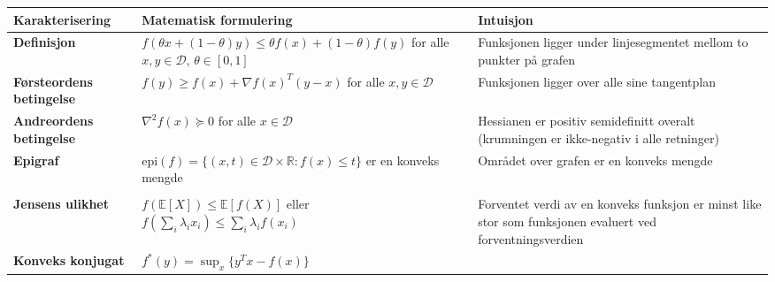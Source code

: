 \begin{table}[H]
	\centering
	\begin{tabular}{|p{3cm}|p{6cm}|p{5cm}|}
		\hline
		\rowcolor{blue!15}
		\textbf{Karakterisering}                                     & \textbf{Matematisk formulering} & \textbf{Intuisjon} \\
		\hline
		\textbf{Definisjon}                                          &
		$f(\theta x + (1-\theta)y) \leq \theta f(x) + (1-\theta)f(y)$ \newline
		for alle $x,y \in \mathcal{D}$, $\theta \in [0,1]$           &
		Funksjonen ligger under linjesegmentet mellom to punkter på grafen                                                  \\
		\hline
		\textbf{Førsteordens betingelse}                             &
		$f(y) \geq f(x) + \nabla f(x)^T(y-x)$ \newline
		for alle $x,y \in \mathcal{D}$                               &
		Funksjonen ligger over alle sine tangentplan                                                                        \\
		\hline
		\textbf{Andreordens betingelse}                              &
		$\nabla^2 f(x) \succeq 0$ for alle $x \in \mathcal{D}$       &
		Hessianen er positiv semidefinitt overalt (krumningen er ikke-negativ i alle retninger)                             \\
		\hline
		\textbf{Epigraf}                                             &
		$\text{epi}(f) = \{(x,t) \in \mathcal{D} \times \mathbb{R} : f(x) \leq t\}$ \newline
		er en konveks mengde                                         &
		Området over grafen er en konveks mengde                                                                            \\
		\hline
		\rowcolor{blue!5}
		\multicolumn{3}{|l|}{\textbf{Avanserte karakteriseringer}}                                                          \\
		\hline
		\textbf{Jensens ulikhet}                                     &
		$f(\mathbb{E}[X]) \leq \mathbb{E}[f(X)]$ \newline
		eller $f(\sum_i \lambda_i x_i) \leq \sum_i \lambda_i f(x_i)$ &
		Forventet verdi av en konveks funksjon er minst like stor som funksjonen evaluert ved forventningsverdien           \\
		\hline
		\textbf{Konveks konjugat}                                    &
		$f^*(y) = \sup_{x} \{y^Tx - f(x)\}$ \newline

\end{tabular}
\end{table}
